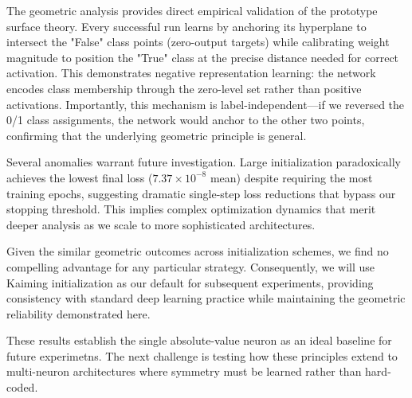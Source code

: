 The geometric analysis provides direct empirical validation of the prototype surface theory. Every successful run learns by anchoring its hyperplane to intersect the "False" class points (zero-output targets) while calibrating weight magnitude to position the "True" class at the precise distance needed for correct activation. This demonstrates negative representation learning: the network encodes class membership through the zero-level set rather than positive activations. Importantly, this mechanism is label-independent—if we reversed the 0/1 class assignments, the network would anchor to the other two points, confirming that the underlying geometric principle is general.

Several anomalies warrant future investigation. Large initialization paradoxically achieves the lowest final loss ($7.37 \times 10^{-8}$ mean) despite requiring the most training epochs, suggesting dramatic single-step loss reductions that bypass our stopping threshold. This implies complex optimization dynamics that merit deeper analysis as we scale to more sophisticated architectures.

Given the similar geometric outcomes across initialization schemes, we find no compelling advantage for any particular strategy. Consequently, we will use Kaiming initialization as our default for subsequent experiments, providing consistency with standard deep learning practice while maintaining the geometric reliability demonstrated here.

These results establish the single absolute-value neuron as an ideal baseline for future experimetns. The next challenge is testing how these principles extend to multi-neuron architectures where symmetry must be learned rather than hard-coded.